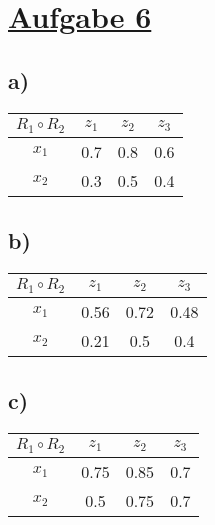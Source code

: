 \section*{\underline{Aufgabe 6}}

\subsection*{a)}

  \begin{tabular}{|c||c|c|c|}
    \hline 
   $R_1 \circ R_2$ & $z_1$ & $z_2$ & $z_3$ \\ 
    \hline\hline
   $x_1$ & 0.7 & 0.8 & 0.6 \\ 
    \hline 
   $x_2$ & 0.3 & 0.5 & 0.4 \\ 
    \hline 
  \end{tabular} 

\subsection*{b)}

  \begin{tabular}{|c||c|c|c|}
    \hline 
    $R_1 \circ R_2$ & $z_1$ & $z_2$ & $z_3$ \\ 
    \hline\hline
    $x_1$ & 0.56 & 0.72 & 0.48 \\ 
    \hline 
    $x_2$ & 0.21 & 0.5 & 0.4 \\ 
    \hline 
  \end{tabular} 

\subsection*{c)}

  \begin{tabular}{|c||c|c|c|}
    \hline 
    $R_1 \circ R_2$ & $z_1$ & $z_2$ & $z_3$ \\ 
    \hline\hline
    $x_1$ & 0.75 & 0.85 & 0.7 \\ 
    \hline 
    $x_2$ & 0.5 & 0.75 & 0.7 \\ 
    \hline 
  \end{tabular} 